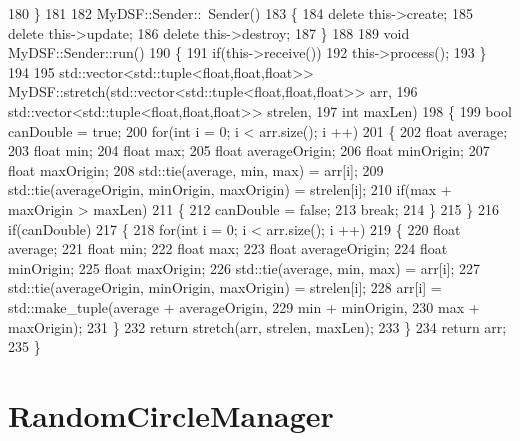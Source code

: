 \begin{DoxyCodeInclude}
180 \}
181 
182 MyDSF::Sender::~Sender()
183 \{
184     \textcolor{keyword}{delete} this->create;
185     \textcolor{keyword}{delete} this->update;
186     \textcolor{keyword}{delete} this->destroy;
187 \}
188 
189 \textcolor{keywordtype}{void} MyDSF::Sender::run()
190 \{
191     \textcolor{keywordflow}{if}(this->receive())
192         this->process();
193 \}
194 
195 std::vector<std::tuple<float,float,float>> MyDSF::stretch(std::vector<std::tuple<float,float,float>> arr,
196                                                    std::vector<std::tuple<float,float,float>> strelen,
197                                                    \textcolor{keywordtype}{int} maxLen)
198 \{
199     \textcolor{keywordtype}{bool} canDouble = \textcolor{keyword}{true};
200     \textcolor{keywordflow}{for}(\textcolor{keywordtype}{int} i = 0; i < arr.size(); i ++)
201     \{
202         \textcolor{keywordtype}{float} average;
203         \textcolor{keywordtype}{float} min;
204         \textcolor{keywordtype}{float} max;
205         \textcolor{keywordtype}{float} averageOrigin;
206         \textcolor{keywordtype}{float} minOrigin;
207         \textcolor{keywordtype}{float} maxOrigin;
208         std::tie(average, min, max) = arr[i];
209         std::tie(averageOrigin, minOrigin, maxOrigin) = strelen[i];
210         \textcolor{keywordflow}{if}(max + maxOrigin > maxLen)
211         \{
212             canDouble = \textcolor{keyword}{false};
213             \textcolor{keywordflow}{break};
214         \}
215     \}
216     \textcolor{keywordflow}{if}(canDouble)
217     \{
218         \textcolor{keywordflow}{for}(\textcolor{keywordtype}{int} i = 0; i < arr.size(); i ++)
219         \{
220             \textcolor{keywordtype}{float} average;
221             \textcolor{keywordtype}{float} min;
222             \textcolor{keywordtype}{float} max;
223             \textcolor{keywordtype}{float} averageOrigin;
224             \textcolor{keywordtype}{float} minOrigin;
225             \textcolor{keywordtype}{float} maxOrigin;
226             std::tie(average, min, max) = arr[i];
227             std::tie(averageOrigin, minOrigin, maxOrigin) = strelen[i];
228             arr[i] = std::make\_tuple(average + averageOrigin,
229                                      min + minOrigin,
230                                      max + maxOrigin);
231         \}
232         \textcolor{keywordflow}{return} stretch(arr, strelen, maxLen);
233     \}
234     \textcolor{keywordflow}{return} arr;
235 \}
\end{DoxyCodeInclude}
 \hypertarget{_benchmark_program_BenchmarkProgramRandomCircleManager}{}\section{Random\+Circle\+Manager}\label{_benchmark_program_BenchmarkProgramRandomCircleManager}
